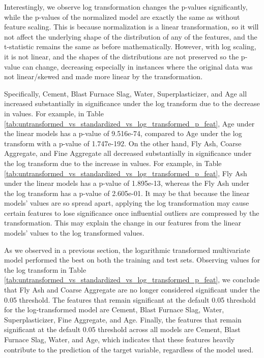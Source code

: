 \documentclass[12pt,letterpaper]{article}
\begin{document}
Interestingly, we observe log transformation changes the p-values significantly, while the p-values of the normalized model are exactly the same as without feature scaling. This is because normalization is a linear transformation, so it will not affect the underlying shape of the distribution of any of the features, and the t-statistic remains the same as before mathematically. However, with log scaling, it is not linear, and the shapes of the distributions are not preserved so the p-value can change, decreasing especially in instances where the original data was not linear/skewed and made more linear by the transformation.

Specifically, Cement, Blast Furnace Slag, Water, Superplasticizer, and Age all increased substantially in significance under the log transform due to the decrease in values. For example, in Table \ref{tab:untransformed_vs_standardized_vs_log_transformed_p_feat}, Age under the linear models has a p-value of 9.516e-74, compared to Age under the log transform with a p-value of 1.747e-192. On the other hand, Fly Ash, Coarse Aggregate, and Fine Aggregate all decreased substantially in significance under the log transform due to the increase in values. For example, in Table \ref{tab:untransformed_vs_standardized_vs_log_transformed_p_feat}, Fly Ash under the linear models has a p-value of 1.895e-13, whereas the Fly Ash under the log transform has a p-value of 2.605e-01. It may be that because the linear models' values are so spread apart, applying the log transformation may cause certain features to lose significance once influential outliers are compressed by the transformation. This may explain the change in our features from the linear models' values to the log transformed values.

As we observed in a previous section, the logarithmic transformed multivariate model performed the best on both the training and test sets. Observing values for the log transform in Table \ref{tab:untransformed_vs_standardized_vs_log_transformed_p_feat}, we conclude that Fly Ash and Coarse Aggregate are no longer considered significant under the 0.05 threshold. The features that remain significant at the default 0.05 threshold for the log-transformed model are Cement, Blast Furnace Slag, Water, Superplasticizer, Fine Aggregate, and Age. Finally, the features that remain significant at the default 0.05 threshold across all models are Cement, Blast Furnace Slag, Water, and Age, which indicates that these features heavily contribute to the prediction of the target variable, regardless of the model used.
\end{document}
